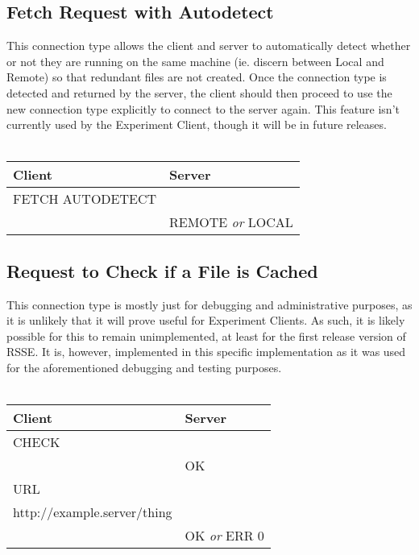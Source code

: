 \documentclass[letterpaper]{article}
\begin{document}
\subsection{Fetch Request with Autodetect}
This connection type allows the client and server to automatically detect whether or not they are running on the same machine (ie. discern between Local and Remote) so that redundant files are not created. Once the connection type is detected and returned by the server, the client should then proceed to use the new connection type explicitly to connect to the server again. This feature isn't currently used by the Experiment Client, though it will be in future releases. 
\\
\\
\begin{tabular}{|l|l|}
\hline
\textbf{Client} & \textbf{Server}\\
\hline
\hline
FETCH AUTODETECT &\\
\hline
& REMOTE \textit{or} LOCAL\\
\hline
\end{tabular}

\subsection{Request to Check if a File is Cached}
This connection type is mostly just for debugging and administrative purposes, as it is unlikely that it will prove useful for Experiment Clients. As such, it is likely possible for this to remain unimplemented, at least for the first release version of RSSE. It is, however, implemented in this specific implementation as it was used for the aforementioned debugging and testing purposes. 
\\
\\
\begin{tabular}{|l|l|}
\hline
\textbf{Client} & \textbf{Server}\\
\hline
\hline
CHECK &\\
\hline
& OK\\
\hline
URL & \\
http://example.server/thing & \\
\hline
& OK \textit{or} ERR 0\\
\hline
\end{tabular}
\end{document}
